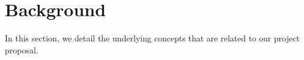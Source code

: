 \section{Background}
\label{sec:background}

In this section, we detail the underlying concepts that are related to our project proposal.









